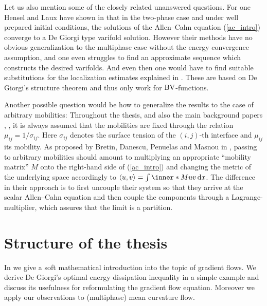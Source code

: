 Let us also mention some of the closely related unanswered questions. For one 
Hensel and Laux have shown in 
\cite{hensel_laux_varifold_solution_concept_for_mean_curvature_flow}
that in the two-phase case and under well prepared initial conditions, the
solutions of the Allen--Cahn equation (\ref{ac_intro}) converge to a De Giorgi 
type varifold solution. However their methods have no obvious generalization to 
the multiphase case without the energy convergence assumption, and one even 
struggles to find an approximate sequence 
which constructs the desired varifolds. And even then one would have to find 
suitable substitutions for the localization estimates explained in 
. 
These are based on De Giorgi's structure 
theorem and thus only work for $ \operatorname{BV} $-functions.

Another possible question would be how to generalize the results to the case 
of 
arbitrary mobilities: Throughout the thesis, and also the main background 
papers 
\cite{convergence_of_allen_cahn_equation_to_multiphase_mean_curvature_flow},
\cite{hensel_laux_varifold_solution_concept_for_mean_curvature_flow}, it is 
always assumed that the mobilities are fixed through the relation $ \mu_{ i j } 
= 1/ \sigma_{ i j } $.
Here $ \sigma_{ i j } $ denotes the surface tension of 
the $ ( i , j ) $-th interface and $ \mu_{ i j } $ its mobility. As proposed by
Bretin, Danescu, Penuelas and Masnou in 
\cite{bretin_dansecu_penuelas_masnou_a_metric_based_approach_to_mmcf_with_mobilities},
passing
to arbitrary mobilities should 
amount to multiplying an appropriate \enquote{mobility matrix} $ M $ onto the 
right-hand side of (\ref{ac_intro}) and changing the metric of the underlying 
space accordingly to $ \langle u , v \rangle = \int \inner*{M u}{ v} \dd{ x } $.
The difference in their approach is to first uncouple their system so that 
they arrive at the scalar Allen--Cahn equation and then couple the components 
through a Lagrange-multiplier, which assures that the limit is a partition.

\section{Structure of the thesis}

In  we give a soft mathematical 
introduction into the topic of gradient flows. We derive De Giorgi's 
optimal energy dissipation inequality in a simple example and discuss its 
usefulness for 
reformulating the gradient flow equation. Moreover we apply our 
observations 
to (multiphase) mean curvature flow.

